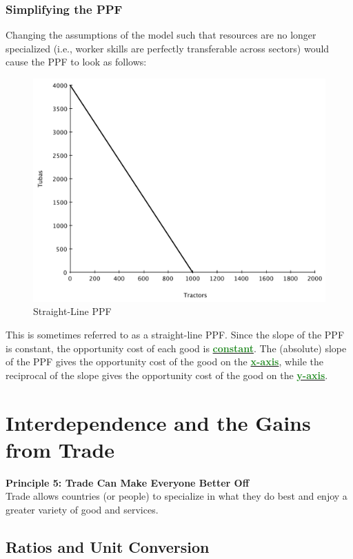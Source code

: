 \documentclass[11pt]{article}\usepackage[]{graphicx}\usepackage[]{color}
\theoremstyle{definition}
\newcommand{\dd}[1]{{\underline{\textbf{\textcolor{ForestGreen}{#1}}}}}
\begin{document}
	\subsubsection*{Simplifying the PPF}
	Changing the assumptions of the model such that resources are no longer specialized (i.e., worker skills are perfectly transferable across sectors) would cause the PPF to look as follows:
	\begin{figure}[H]
		\centering
		\includegraphics[scale=.40]{plot4.pdf}
		\caption{Straight-Line PPF}
		\label{ppf4}
	\end{figure}
	
	This is sometimes referred to as a straight-line PPF. Since the slope of the PPF is constant, the opportunity cost of each good is \dd{constant}. The (absolute) slope of the PPF gives the opportunity cost of the good on the \dd{x-axis}, while the reciprocal of the slope gives the opportunity cost of the good on the \dd{y-axis}.
	
\newpage
	
	\section{Interdependence and the Gains from Trade}	
	
	\textbf{Principle 5: Trade Can Make Everyone Better Off}
	\\
	
	Trade allows countries (or people) to specialize in what they do best and enjoy a greater variety of good and services.
	
	\subsection{Ratios and Unit Conversion}
\end{document}
